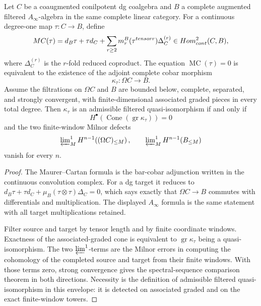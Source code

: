 \begin{lem}\label{lem:filtered-cobar-qiso-criterion}
  Let \(C\) be a coaugmented conilpotent dg coalgebra and \(B\) a
  complete augmented filtered \(A_\infty\)-algebra in the same complete
  linear category.  For a continuous degree-one map
  \(\tau\colon C\to B\), define
  \[
    MC(\tau)
      =
      d_B\tau+\tau d_C
      +\sum_{r\geq2}m_r^B(\tau^{tensor r})\Delta_C^{(r)}
      \in Hom^2_{cont}(C,B),
  \]
  where \(\Delta_C^{(r)}\) is the \(r\)-fold reduced coproduct.  The
  equation \(\operatorname{MC}(\tau)=0\) is equivalent to the existence
  of the adjoint complete cobar morphism
  \[
    \kappa_\tau\colon\Omega C\longrightarrow B .
  \]
  Assume the filtrations on \(\Omega C\) and \(B\) are bounded below,
  complete, separated, and strongly convergent, with finite-dimensional
  associated graded pieces in every total degree.  Then
  \(\kappa_\tau\) is an admissible filtered quasi-isomorphism if and
  only if
  \[
    H^\bullet\!\left(\operatorname{Cone}(
      \operatorname{gr}\kappa_\tau)\right)=0
  \]
  and the two finite-window Milnor defects
  \[
    \varprojlim\nolimits^1_M
      H^{n-1}\!\left((\Omega C)_{\leq M}\right),
    \qquad
    \varprojlim\nolimits^1_M
      H^{n-1}\!\left(B_{\leq M}\right)
  \]
  vanish for every \(n\).
\end{lem}

\begin{proof}
  The Maurer--Cartan formula is the bar-cobar adjunction written in the
  continuous convolution complex.  For a dg target it reduces to
  \(d_B\tau+\tau d_C+\mu_B(\tau\otimes\tau)\Delta_C=0\), which says
  exactly that \(\Omega C\to B\) commutes with differentials and
  multiplication.  The displayed \(A_\infty\) formula is the same
  statement with all target multiplications retained.

  Filter source and target by tensor length and by finite coordinate
  windows.  Exactness of the associated-graded cone is equivalent to
  \(\operatorname{gr}\kappa_\tau\) being a quasi-isomorphism.  The two
  \(\varprojlim^1\)-terms are the Milnor errors in computing the
  cohomology of the completed source and target from their finite
  windows.  With those terms zero, strong convergence gives the
  spectral-sequence comparison theorem in both directions.  Necessity is
  the definition of admissible filtered quasi-isomorphism in this
  envelope: it is detected on associated graded and on the exact
  finite-window towers.
\end{proof}

